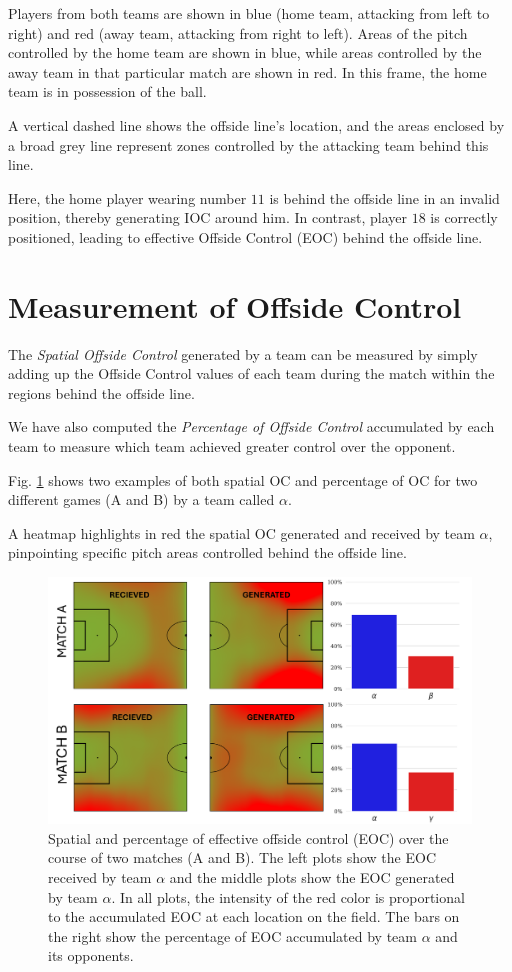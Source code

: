 \documentclass[
  10pt,
  twoside,nohyper]{book}
\begin{document}
Players from both teams are shown in blue (home team, attacking from left to right) and red (away team, attacking from right to left). Areas of the pitch controlled by the home team are shown in blue, while areas controlled by the away team in that particular match are shown in red. In this frame, the home team is in possession of the ball.

A vertical dashed line shows the offside line's location, and the areas enclosed by a broad grey line represent zones controlled by the attacking team behind this line.

Here, the home player wearing number \(11\) is behind the offside line in an invalid position, thereby generating IOC around him. In contrast, player \(18\) is correctly positioned, leading to effective Offside Control (EOC) behind the offside line.

\section{Measurement of Offside Control}\label{measurement-of-offside-control}

The \emph{Spatial Offside Control} generated by a team can be measured by simply adding up the Offside Control values of each team during the match within the regions behind the offside line.

We have also computed the \emph{Percentage of Offside Control} accumulated by each team to measure which team achieved greater control over the opponent.

Fig. \ref{fig:games} shows two examples of both spatial OC and percentage of OC for two different games (A and B) by a team called \(\alpha\).

A heatmap highlights in red the spatial OC generated and received by team \(\alpha\), pinpointing specific pitch areas controlled behind the offside line.

\begin{figure}[H]

{\centering \includegraphics[width=0.8\linewidth,]{imagenes/Games_OC} 

}

\caption{Spatial and percentage of effective offside control (EOC) over the course of two matches (A and B). The left plots show the EOC received by team $\alpha$ and the middle plots show the EOC generated by team $\alpha$. In all plots, the intensity of the red color is proportional to the accumulated EOC at each location on the field. The bars on the right show the percentage of EOC accumulated by team $\alpha$ and its opponents.}\label{fig:games}
\end{figure}
\end{document}
